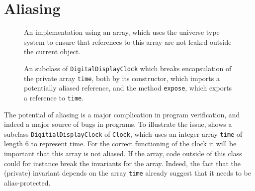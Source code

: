 \documentclass{llncs}
\begin{document}
% 
% 
% 

\section{Aliasing}
\label{Sec:ownership}

\begin{figure}[tbp] \label{Example:alias}
%
%
\vspace*{-2ex} %
\caption{An implementation using an array, which uses the universe type 
system \cite{Mueller-Poetzsch-Heffter-Leavens03} to ensure that references
to this array are not leaked outside the current object.}
\end{figure}

\begin{figure}[tbp] \label{Example:brokenalias}
%
%
\vspace*{-2ex} %
\caption{An subclass of \texttt{DigitalDisplayClock} which breaks encapsulation
of the private array \texttt{time}, both by its constructor, which imports
a potentially aliased reference, and the method \texttt{expose}, which exports
a reference to \texttt{time}.}
\end{figure}

The potential of aliasing is a major complication in program verification,
and indeed a major source of bugs in programs. 
To illustrate the issue,  shows a subclass 
\texttt{DigitialDisplayClock} 
of \texttt{Clock}, which uses an integer array \texttt{time} of length 6 
to represent time.  For the correct functioning of the clock it will be 
important that this array is not aliased. If the array, code outside of
this class could for instance break the invariants for the array.
Indeed, the fact that the (private) invariant depends on the array \texttt{time}
already suggest that it needs to be alias-protected.
\end{document}
